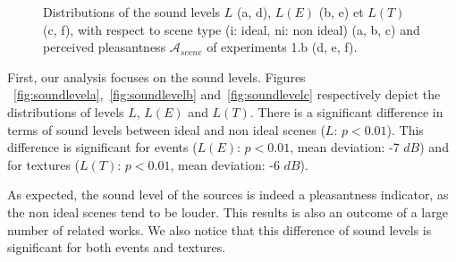 \documentclass[12pt]{elsarticle}
\begin{document}
\begin{figure}[t]
       \caption{Distributions of the sound levels $L$ (a, d), $L(E)$ (b, e) et $L(T)$ (c, f), with respect to scene type (i: ideal, ni: non ideal) (a, b, c) and perceived pleasantness $\mathcal{A}_{scene}$ of experiments 1.b (d, e, f).}
\end{figure}


First, our analysis focuses on the sound levels. Figures ~\ref{fig:soundlevela},~\ref{fig:soundlevelb} and~\ref{fig:soundlevelc} respectively depict the distributions of levels $L$, $L(E)$ and $L(T)$. There is a significant difference in terms of sound levels between ideal and non ideal scenes ($L$: $p<0.01$). This difference is significant for events ($L(E)$: $p<0.01$, mean deviation: -7 $dB$) and for textures ($L(T)$: $p<0.01$, mean deviation: -6 $dB$).


As expected, the sound level of the sources is indeed a pleasantness indicator, as the non ideal scenes tend to be louder. This results is also an outcome of a large number of related works. We also notice that this difference of sound levels is significant for both events and textures.
\end{document}
